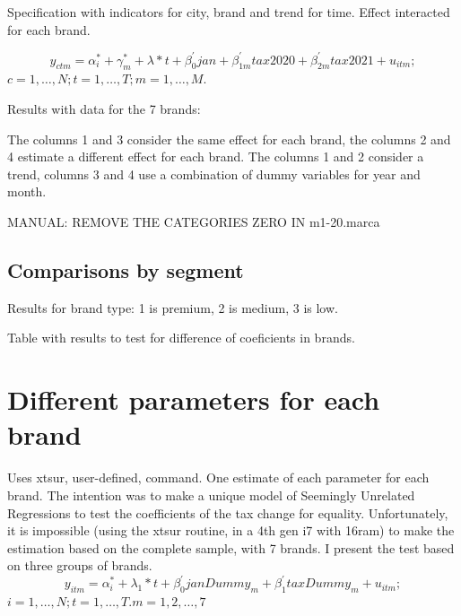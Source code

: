 \documentclass[]{article}
\begin{document}
Specification with indicators for city, brand and trend for time.
Effect interacted for each brand.

\begin{equation*} 
	y_{ctm}  = \alpha_{i}^{*} + \gamma_{m}^{*} + \lambda*t + \beta_{0}^{'}jan + \beta_{1m}^{'}tax2020 + \beta_{2m}^{'}tax2021 + u_{itm}
	;   \tag{2.2}
\end{equation*}
$c  = 1,\ldots,N;  t=1,\ldots,T; m=1,\ldots,M. $

Results with data for the 7 brands:

%


The columns 1 and 3 consider the same effect for each brand, the columns 2 and 4 estimate a different effect for each brand. The columns 1 and 2 consider a trend, columns 3 and 4 use a combination of dummy variables for year and month.

MANUAL: REMOVE THE CATEGORIES ZERO IN m1-20.marca

\subsection{Comparisons by segment}

Results for brand type: 1 is premium, 2 is medium, 3 is low.

%


Table with results to test for difference of coeficients in brands.

\begin{landscape}
	
\end{landscape}


\section{Different parameters for each brand}
Uses xtsur, user-defined, command.
One estimate of each parameter for each brand. 
The intention was to make a unique model of Seemingly Unrelated Regressions to test the coefficients of the tax change for equality. 
Unfortunately, it is impossible (using the xtsur routine, in a 4th gen i7 with 16ram) to make the estimation based on the complete sample, with 7 brands. I present the test based on three groups of brands.
\begin{equation*} 
	y_{itm}  = \alpha_{i}^{*} + \lambda_{1}*t +\beta_{0}^{'}janDummy_{m} + \beta_{1}^{'}taxDummy_{m} + u_{itm}
	;  
\end{equation*}
$i  = 1,\ldots,N;  t=1,\ldots,T. m = 1,2,\ldots,7$
\end{document}
